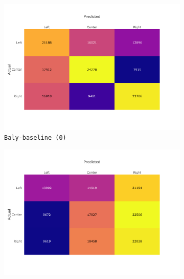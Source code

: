 \begin{figure}[!htb]
    \centering
     \begin{subfigure}[b]{0.48\linewidth}
         \centering
         \includegraphics[trim={0 2cm 2cm 1cm},clip,width=\linewidth]{figures/nela_allsides_subset_media_balanced_confusion_matrix_bert.pdf}
         \caption{\texttt{Baly-baseline (0)}}
         \label{fig:nela_confusion_bert}
     \end{subfigure}
    \begin{subfigure}[b]{0.48\linewidth}
         \centering 
         \includegraphics[trim={0 2cm 2cm 1cm},clip,width=\linewidth]{figures/nela_allsides_subset_media_balanced_confusion_matrix_propaganda_techniques_tf_idf.pdf}

\end{subfigure}
\end{figure}
